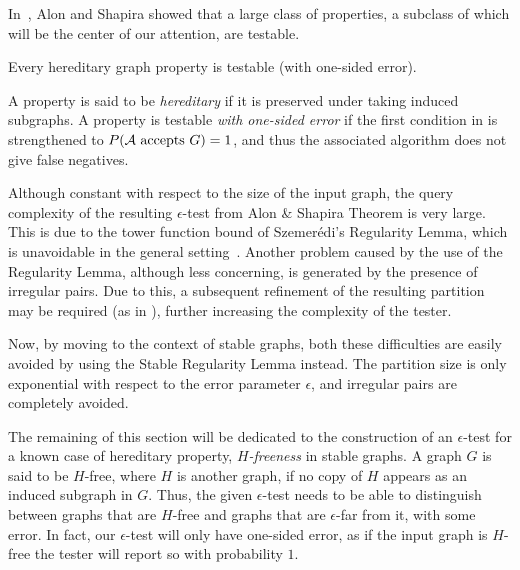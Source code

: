     In~\cite{a_characterization_of_the_natural_graph_properties_testable_with_one_sided_error}, Alon and Shapira
    showed that a large class of properties, a subclass of which will be the center of our attention, are testable.

    \begin{theorem}
        Every hereditary graph property is testable (with one-sided error).
    \end{theorem}

    A property is said to be \emph{hereditary} if it is preserved under taking induced subgraphs.
    A property is testable \emph{with one-sided error} if the first condition in 
    is strengthened to $P( \mathcal{A} \text{ accepts } G ) = 1$, and thus the associated algorithm does
    not give false negatives.

    Although constant with respect to the size of the input graph, the query complexity of the resulting $\epsilon$-test
    from Alon \& Shapira Theorem is very large.
    This is due to the tower function bound of Szemer\'edi's Regularity Lemma, which is unavoidable in the general
    setting~\cite{lower_bounds_of_tower_type_for_szeremedis_uniformity_lemma}.
    Another problem caused by the use of the Regularity Lemma, although less concerning, is generated by the presence of
    irregular pairs.
    Due to this, a subsequent refinement of the resulting partition may be required
    (as in \cite{regularity_lemmas_for_stable_graphs}), further increasing the complexity of the tester.

    Now, by moving to the context of stable graphs, both these difficulties are easily avoided by using the
    Stable Regularity Lemma instead.
    The partition size is only exponential with respect to the error parameter $\epsilon$, and irregular pairs are
    completely avoided. 

    The remaining of this section will be dedicated to the construction of an $\epsilon$-test for a known case
    of hereditary property, \emph{$H$-freeness} in stable graphs.
    A graph $G$ is said to be $H$-free, where $H$ is another graph, if no copy of $H$ appears as an induced subgraph in $G$.
    Thus, the given $\epsilon$-test needs to be able to distinguish between graphs that are $H$-free and graphs that
    are $\epsilon$-far from it, with some error.
    In fact, our $\epsilon$-test will only have one-sided error, as if the input graph is $H$-free the tester will
    report so with probability $1$.

